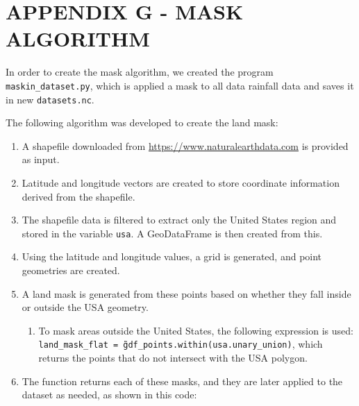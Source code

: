 \hypertarget{estilo:apendice}{} %
\renewcommand{\thechapter}{G}%
\chapter{APPENDIX G - MASK ALGORITHM}	%
\label{apendiceG}	%


In order to create the mask algorithm, we created the program \texttt{maskin\_dataset.py}, which is applied a mask to all data rainfall data and saves it in new \texttt{datasets.nc}.

The following algorithm was developed to create the land mask:

\begin{enumerate}[label=\arabic*.]
	\item A shapefile downloaded from \url{https://www.naturalearthdata.com} is provided as input.
	\item Latitude and longitude vectors are created to store coordinate information derived from the shapefile.
	\item The shapefile data is filtered to extract only the United States region and stored in the variable \texttt{usa}. A GeoDataFrame is then created from this.
	\item Using the latitude and longitude values, a grid is generated, and point geometries are created.
	\item A land mask is generated from these points based on whether they fall inside or outside the USA geometry.
	\begin{enumerate}[label=\alph*.]
		\item To mask areas outside the United States, the following expression is used:
		\texttt{land\_mask\_flat = \~ gdf\_points.within(usa.unary\_union)},
		which returns the points that do not intersect with the USA polygon.
	\end{enumerate}
	\item The function returns each of these masks, and they are later applied to the dataset as needed, as shown in this code:
\end{enumerate}




